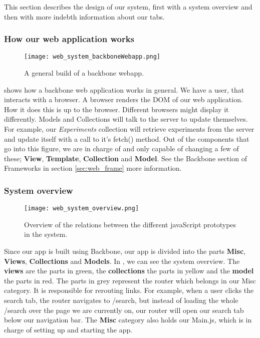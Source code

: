This section describes the design of our system, first with a system overview and then with more indebth information about our tabs.

\subsubsection{How our web application works}
\begin{figure}[ht]
\centering
\texttt{[image: web\_system\_backboneWebapp.png]}
\caption{\label{fig:web_system_backboneWebapp}A general build of a backbone webapp.}
\end{figure}

 shows how a backbone\cite{web_1} web application works in general. We have a user, that interacts with a browser. A browser renders the DOM of our web application. How it does this is up to the browser. Different browsers might display it differently. Models and Collections will talk to the server to update themselves. For example, our \textit{Experiments} collection will retrieve experiments from the server and update itself with a call to it’s fetch() method. Out of the components that go into this figure, we are in charge of and only capable of changing a few of these; \textbf{View}, \textbf{Template}, \textbf{Collection} and \textbf{Model}. See the Backbone section of Frameworks in section \ref{sec:web_frame} more information.

\subsubsection{System overview}
\begin{figure}[ht]
\centering
\texttt{[image: web\_system\_overview.png]}
\caption{\label{fig:web_system_overview}Overview of the relations between the different javaScript prototypes in the system.}
\end{figure}

Since our app is built using Backbone\cite{web_1}, our app is divided into the parts \textbf{Misc}, \textbf{Views}, \textbf{Collections} and \textbf{Models}. In , we can see the system overview. The \textbf{views} are the parts in green, the \textbf{collections} the parts in yellow and the \textbf{model} the parts in red. The parts in grey represent the router which belongs in our Misc category. It is responsible for rerouting links. For example, when a user clicks the search tab, the router navigates to /search, but instead of loading the whole /search over the page we are currently on, our router will open our search tab below our navigation bar. The \textbf{Misc} category also holds our Main.js, which is in charge of setting up and starting the app.

